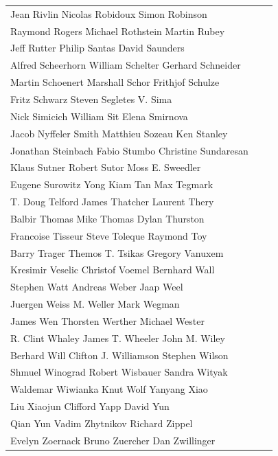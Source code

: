 \begin{tabular}{lll}
Jean Rivlin            Nicolas Robidoux       Simon Robinson\\
Raymond Rogers         Michael Rothstein      Martin Rubey\\
Jeff Rutter            Philip Santas          David Saunders\\
Alfred Scheerhorn      William Schelter       Gerhard Schneider\\
Martin Schoenert       Marshall Schor         Frithjof Schulze\\
Fritz Schwarz          Steven Segletes        V. Sima\\
Nick Simicich          William Sit            Elena Smirnova\\
Jacob Nyffeler Smith   Matthieu Sozeau        Ken Stanley\\
Jonathan Steinbach     Fabio Stumbo           Christine Sundaresan\\
Klaus Sutner           Robert Sutor           Moss E. Sweedler\\
Eugene Surowitz        Yong Kiam Tan          Max Tegmark\\
T. Doug Telford        James Thatcher         Laurent Thery\\
Balbir Thomas          Mike Thomas            Dylan Thurston\\
Francoise Tisseur      Steve Toleque          Raymond Toy\\
Barry Trager           Themos T. Tsikas       Gregory Vanuxem\\
Kresimir Veselic       Christof Voemel        Bernhard Wall\\
Stephen Watt           Andreas Weber          Jaap Weel\\
Juergen Weiss          M. Weller              Mark Wegman\\
James Wen              Thorsten Werther       Michael Wester\\
R. Clint Whaley        James T. Wheeler       John M. Wiley\\
Berhard Will           Clifton J. Williamson  Stephen Wilson\\
Shmuel Winograd        Robert Wisbauer        Sandra Wityak\\
Waldemar Wiwianka      Knut Wolf              Yanyang Xiao\\
Liu Xiaojun            Clifford Yapp          David Yun\\
Qian Yun               Vadim Zhytnikov        Richard Zippel\\
Evelyn Zoernack        Bruno Zuercher         Dan Zwillinger\\
\end{tabular}
\newpage


